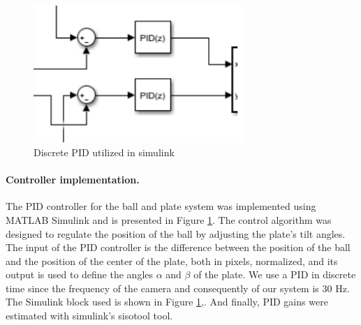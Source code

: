  \begin{center}
    \begin{figure}[ht!]
        \centering
        \includegraphics[width=8cm, keepaspectratio]{imports/controller-simulink.png}
        \caption{Discrete PID utilized in simulink}
        \label{Discrete PID utilized in simulink}
    \end{figure}
\end{center}

\paragraph{Controller implementation.}
The PID controller for the ball and plate system was implemented using MATLAB Simulink\cite{noauthor_simulink_nodate} and is presented in Figure \ref{Discrete PID utilized in simulink}. The control algorithm was designed to regulate the position of the ball by adjusting the plate's tilt angles. The input of the PID controller is the difference between the position of the ball and the position of the center of the plate, both in pixels, normalized, and its output is used to define the angles $\alpha$  and $\beta$  of the plate. We use a PID in discrete time\cite{noauthor_continuous-time_nodate} since the frequency of the camera and consequently of our system is 30 Hz. The Simulink block used is shown in Figure \ref{Discrete PID utilized in simulink},. And finally, PID gains were estimated with simulink's sisotool\cite{noauthor_design_nodate} tool. 
